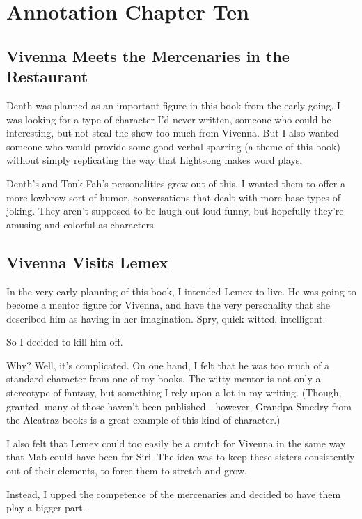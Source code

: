 \section{Annotation Chapter Ten}

\subsection*{Vivenna Meets the Mercenaries in the Restaurant}

Denth was planned as an important figure in this book from the early going. I was looking for a type of character I’d never written, someone who could be interesting, but not steal the show too much from Vivenna. But I also wanted someone who would provide some good verbal sparring (a theme of this book) without simply replicating the way that Lightsong makes word plays.

Denth’s and Tonk Fah’s personalities grew out of this. I wanted them to offer a more lowbrow sort of humor, conversations that dealt with more base types of joking. They aren’t supposed to be laugh-out-loud funny, but hopefully they’re amusing and colorful as characters.

\subsection*{Vivenna Visits Lemex}

In the very early planning of this book, I intended Lemex to live. He was going to become a mentor figure for Vivenna, and have the very personality that she described him as having in her imagination. Spry, quick-witted, intelligent.

So I decided to kill him off.

Why? Well, it’s complicated. On one hand, I felt that he was too much of a standard character from one of my books. The witty mentor is not only a stereotype of fantasy, but something I rely upon a lot in my writing. (Though, granted, many of those haven’t been published—however, Grandpa Smedry from the Alcatraz books is a great example of this kind of character.)

I also felt that Lemex could too easily be a crutch for Vivenna in the same way that Mab could have been for Siri. The idea was to keep these sisters consistently out of their elements, to force them to stretch and grow.

Instead, I upped the competence of the mercenaries and decided to have them play a bigger part.



